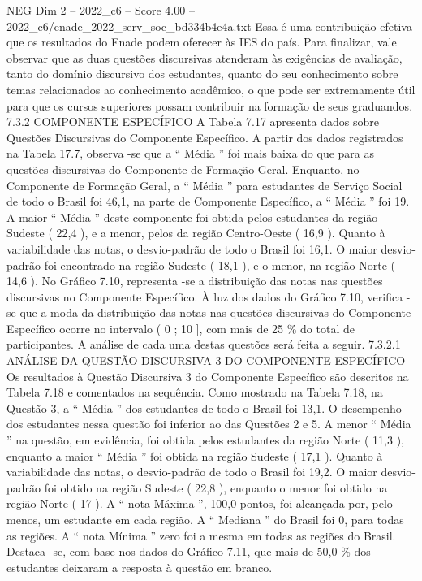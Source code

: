 \begin{textsample}{NEG Dim 2 – 2022\_c6 – Score 4.00 – 2022\_c6/enade\_2022\_serv\_soc\_bd334b4e4a.txt}
Essa é uma contribuição efetiva que os resultados do Enade podem oferecer às IES do país.
Para finalizar, vale observar que as duas questões discursivas atenderam às exigências de avaliação, tanto do domínio discursivo dos estudantes, quanto do seu conhecimento sobre temas relacionados ao conhecimento acadêmico, o que pode ser extremamente útil para que os cursos superiores possam contribuir na formação de seus graduandos. 7.3.2 COMPONENTE ESPECÍFICO A Tabela 7.17 apresenta dados sobre Questões Discursivas do Componente Específico.
A partir dos dados registrados na Tabela 17.7, observa -se que a “ Média ” foi mais baixa do que para as questões discursivas do Componente de Formação Geral.
Enquanto, no Componente de Formação Geral, a “ Média ” para estudantes de Serviço Social de todo o Brasil foi 46,1, na parte de Componente Específico, a “ Média ” foi 19.
A maior “ Média ” deste componente foi obtida pelos estudantes da região Sudeste ( 22,4 ), e a menor, pelos da região Centro-Oeste ( 16,9 ).
Quanto à variabilidade das notas, o desvio-padrão de todo o Brasil foi 16,1.
O maior desvio-padrão foi encontrado na região Sudeste ( 18,1 ), e o menor, na região Norte ( 14,6 ).
No Gráfico 7.10, representa -se a distribuição das notas nas questões discursivas no Componente Específico.
À luz dos dados do Gráfico 7.10, verifica -se que a moda da distribuição das notas nas questões discursivas do Componente Específico ocorre no intervalo ( 0 ; 10 ], com mais de 25 \% do total de participantes.
A análise de cada uma destas questões será feita a seguir. 7.3.2.1 ANÁLISE DA QUESTÃO DISCURSIVA 3 DO COMPONENTE ESPECÍFICO Os resultados à Questão Discursiva 3 do Componente Específico são descritos na Tabela 7.18 e comentados na sequência.
Como mostrado na Tabela 7.18, na Questão 3, a “ Média ” dos estudantes de todo o Brasil foi 13,1.
O desempenho dos estudantes nessa questão foi inferior ao das Questões 2 e 5.
A menor “ Média ” na questão, em evidência, foi obtida pelos estudantes da região Norte ( 11,3 ), enquanto a maior “ Média ” foi obtida na região Sudeste ( 17,1 ).
Quanto à variabilidade das notas, o desvio-padrão de todo o Brasil foi 19,2.
O maior desvio-padrão foi obtido na região Sudeste ( 22,8 ), enquanto o menor foi obtido na região Norte ( 17 ).
A “ nota Máxima ”, 100,0 pontos, foi alcançada por, pelo menos, um estudante em cada região.
A “ Mediana ” do Brasil foi 0, para todas as regiões.
A “ nota Mínima ” zero foi a mesma em todas as regiões do Brasil.
Destaca -se, com base nos dados do Gráfico 7.11, que mais de 50,0 \% dos estudantes deixaram a resposta à questão em branco.

\end{textsample}
